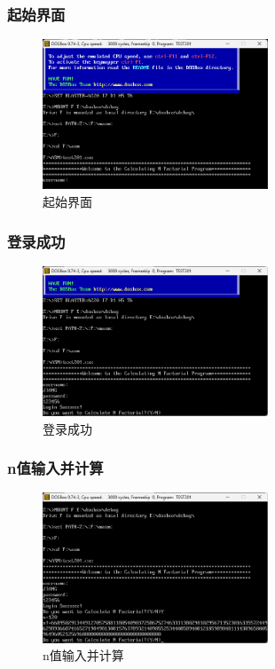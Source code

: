 \documentclass[UTF8,12pt]{article}
\begin{document}
\subsubsection{起始界面}
\begin{figure}[htbp]
    \centering
    \includegraphics[width=0.6\textwidth]{img/10.png}
    \caption{起始界面}
\end{figure}

\subsubsection{登录成功}
\begin{figure}[htbp]
    \centering
    \includegraphics[width=0.6\textwidth]{img/11.png}
    \caption{登录成功}
\end{figure}

\newpage

\subsubsection{n值输入并计算}
\begin{figure}[htbp]
    \centering
    \includegraphics[width=0.6\textwidth]{img/12.png}
    \caption{n值输入并计算}
\end{figure}
\end{document}
